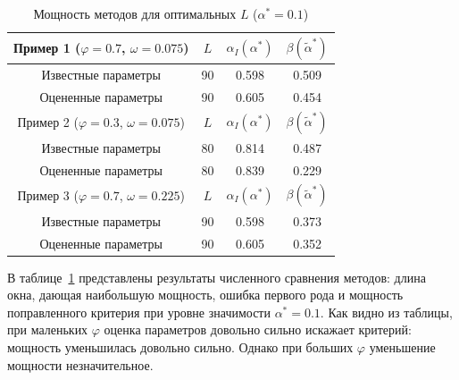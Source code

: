 \documentclass[specialist,
substylefile = spbu_report.rtx,
subf,href,colorlinks=true, 12pt]{disser}
\theoremstyle{definition}
\begin{document}
\begin{table}[h]
	\caption{Мощность методов для оптимальных $L$ ($\alpha^*=0.1$)}
	\label{tab:res_mc-ssa_est}
	\centering
	\begin{tabular}{|cccc|}\hline
		Пример 1 ($\varphi=0.7$, $\omega=0.075$) & $L$ & $\alpha_I(\alpha^*)$ & $\beta(\widetilde\alpha^*)$ \\
		\hline
		Известные параметры & 90 & 0.598 & 0.509 \\
		\hline
		Оцененные параметры & 90 & 0.605 & 0.454 \\
		\hhline{====}
		Пример 2 ($\varphi=0.3$, $\omega=0.075$) & $L$ & $\alpha_I(\alpha^*)$ & $\beta(\widetilde\alpha^*)$ \\
		\hline
		Известные параметры & 80 & 0.814 & 0.487 \\
		\hline
		Оцененные параметры & 80 & 0.839 & 0.229 \\
		\hhline{====}
		Пример 3 ($\varphi=0.7$, $\omega=0.225$) & $L$ & $\alpha_I(\alpha^*)$ & $\beta(\widetilde\alpha^*)$ \\
		\hline
		Известные параметры & 90 & 0.598 & 0.373 \\
		\hline
		Оцененные параметры & 90 & 0.605 & 0.352\\
		\hline
	\end{tabular}
\end{table}

В таблице~\ref{tab:res_mc-ssa_est} представлены результаты численного сравнения методов: длина окна, дающая наибольшую мощность, ошибка первого рода и мощность поправленного критерия при уровне значимости $\alpha^*=0.1$. Как видно из таблицы, при маленьких $\varphi$ оценка параметров довольно сильно искажает критерий: мощность уменьшилась довольно сильно. Однако при больших $\varphi$ уменьшение мощности незначительное.


\end{document}
